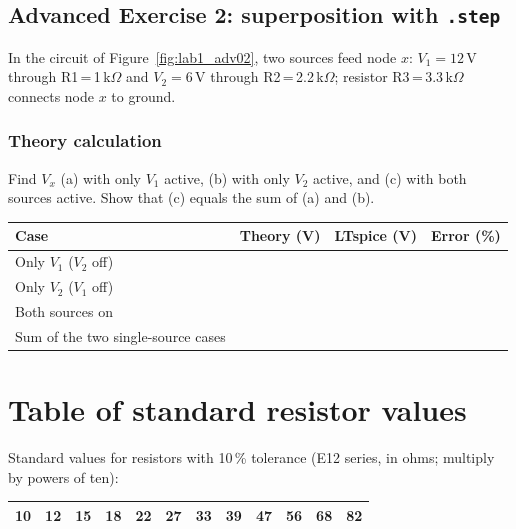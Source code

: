 \newpage
\subsection{Advanced Exercise 2: superposition with \texttt{.step}}
In the circuit of Figure~\ref{fig:lab1_adv02}, two sources feed node $x$: $V_1=12$\,V through R1\,=\,1\,k$\Omega$ and $V_2=6$\,V through R2\,=\,2.2\,k$\Omega$; resistor R3\,=\,3.3\,k$\Omega$ connects node $x$ to ground.
\subsubsection{Theory calculation}\vspace{-3pt}
\notesblock
Find $V_x$ (a) with only $V_1$ active, (b) with only $V_2$ active, and (c) with both sources active. Show that (c) equals the sum of (a) and (b).
\begin{center}\renewcommand{\arraystretch}{1.8}
\begin{tabular}{|p{5.2cm}|c|c|c|}\hline
\textbf{Case} & \textbf{Theory (V)} & \textbf{LTspice (V)} & \textbf{Error (\%)}\\ \hline
Only $V_1$ ($V_2$ off) & & & \\ \hline
Only $V_2$ ($V_1$ off) & & & \\ \hline
Both sources on & & & \\ \hline
Sum of the two single-source cases & & & \\ \hline
\end{tabular}\end{center}

\section*{Table of standard resistor values}
Standard values for resistors with 10\,\% tolerance (E12 series, in ohms; multiply by powers of ten):
\begin{center}\renewcommand{\arraystretch}{1.4}
\begin{tabular}{|*{12}{c|}}\hline
10 & 12 & 15 & 18 & 22 & 27 & 33 & 39 & 47 & 56 & 68 & 82\\ \hline
\end{tabular}\end{center}

